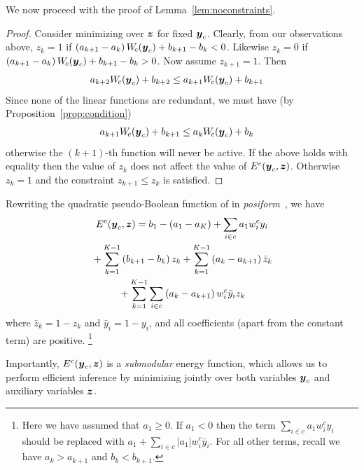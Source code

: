 \documentclass[10pt,journal,letterpaper,compsoc]{IEEEtran}
\renewcommand{\cite}{\citep}
\begin{document}
We now proceed with the proof of Lemma~\ref{lem:noconstraints}.

\begin{proof}
  Consider minimizing  over ${\boldsymbol{z}}$ for
  fixed ${\boldsymbol{y}}_c$. Clearly, from our observations above, $z_k = 1$ if
  $\left(a_{k+1} - a_{k}\right) W_{\!c}({\boldsymbol{y}}_c) + b_{k+1} - b_k <
  0$. Likewise $z_k = 0$ if $\left(a_{k+1} - a_{k}\right) W_{\!c}({\boldsymbol{y}}_c) +
  b_{k+1} - b_k > 0$. Now assume $z_{k+1} = 1$. Then
  \begin{align*}
    a_{k+2} W_{\!c}({\boldsymbol{y}}_c) + b_{k+2} &\leq a_{k+1} W_{\!c}({\boldsymbol{y}}_c) + b_{k+1}
  \end{align*}
  Since none of the linear functions are redundant, we must have
  (by Proposition~\ref{prop:condition})
  \begin{align*}
    a_{k+1} W_{\!c}({\boldsymbol{y}}_c) + b_{k+1} &\leq a_{k} W_{\!c}({\boldsymbol{y}}_c) + b_{k}
  \end{align*}
  otherwise the $(k+1)$-th function will never be active. If the above
  holds with equality then the value of $z_{k}$ does not affect the
  value of $E^c({\boldsymbol{y}}_c, {\boldsymbol{z}})$. Otherwise $z_{k} = 1$ and the constraint
  $z_{k+1} \leq z_k$ is satisfied.
\end{proof}
\bigskip

Rewriting the quadratic pseudo-Boolean function of
 in \emph{posiform}~\cite{Boros:MATH02},
we have
%
\begin{multline}
  E^c(\by_c, \bz)
  = b_1 - (a_1 - a_K) + \sum_{i \in c} a_1 w^c_i y_i \\
  {}+ \sum_{k = 1}^{K - 1} \left( b_{k+1} - b_k \right) z_k 
  + \sum_{k = 1}^{K - 1} \left( a_k - a_{k+1} \right) \bar{z}_k \\
  {}+ \sum_{k = 1}^{K - 1} \sum_{i \in c} \left( a_k - a_{k+1} \right) w^c_i \bar{y}_i z_k
  \label{eqn:posiform}  
\end{multline}
%
where $\bar{z}_k = 1 - z_k$ and $\bar{y}_i = 1 - y_i$, and all
coefficients (apart from the constant term) are
positive.%
%
\footnote{Here we have assumed that $a_1 \geq 0$. If $a_1 < 0$ then
  the term $\sum_{i \in c} a_1 w^c_i y_i$ should be replaced with $a_1
  + \sum_{i \in c} \left|a_1\right| w^c_i \bar{y}_i$. For all other
  terms, recall we have $a_k > a_{k+1}$ and $b_k < b_{k+1}$.}

Importantly, $E^c({\boldsymbol{y}}_c, {\boldsymbol{z}})$ is a \emph{submodular} energy function,
which allows us to perform efficient inference by minimizing jointly
over both variables ${\boldsymbol{y}}_c$ and auxiliary variables ${\boldsymbol{z}}$.
\end{document}
